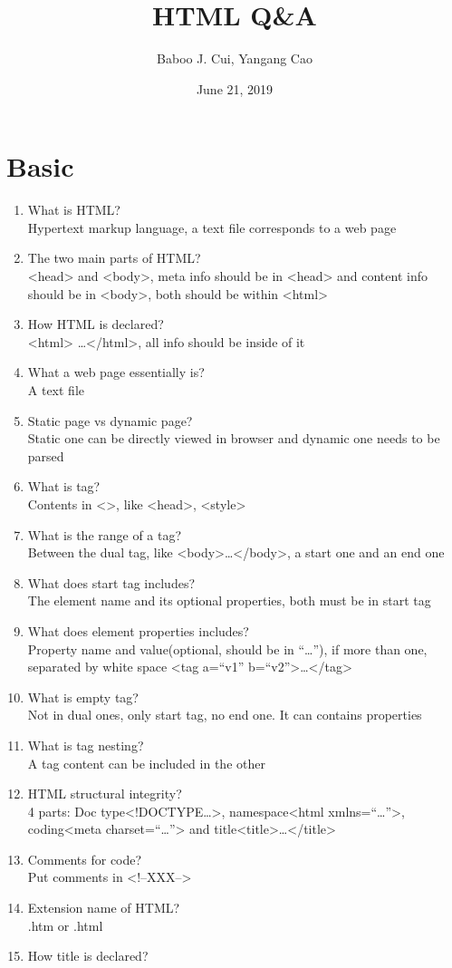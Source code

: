 \documentclass[10pt,a4paper,oneside]{article}
\date{June 21, 2019}
\author{Baboo J. Cui, Yangang Cao}
\title{HTML Q\&A}
\begin{document}
\maketitle
\tableofcontents

\newpage
\section{Basic}
\begin{enumerate}[1.]
\item  What is HTML?   \\
Hypertext markup language, a text file corresponds to a web page
\item   The two main parts of HTML?  \\
<head> and <body>, meta info should be in <head> and content info should be in <body>, both should be within <html>
\item    How HTML is declared? \\
<html> \dots </html>, all info should be inside of it
\item  What a web page essentially is?   \\
A text file
\item  Static page vs dynamic page?   \\
Static one can be directly viewed in browser and dynamic one needs to be parsed
\item  What is tag?   \\
Contents in <>, like <head>, <style>
\item  What is the range of a tag?   \\
Between the dual tag, like <body>…</body>, a start one and an end one
\item  What does start tag includes?   \\
The element name and its optional properties, both must be in start tag
\item  What does element properties includes?   \\
Property name and value(optional, should be in ``\dots''), if more than one, separated by white space <tag a=``v1'' b=``v2''>\dots</tag>
\item   What is empty tag?  \\
Not in dual ones, only start tag, no end one. It can contains properties
\item    What is tag nesting? \\
A tag content can be included in the other
\item   HTML structural integrity?  \\
4 parts: Doc type<!DOCTYPE\dots>, namespace<html xmlns=``\dots''>, coding<meta charset=``\dots''> and title<title>\dots</title>
\item  Comments for code?   \\
Put comments in <!--XXX-->
\item  Extension name of HTML?   \\
.htm or .html
\item  How title is declared?   \\
\end{enumerate}
\end{document}
